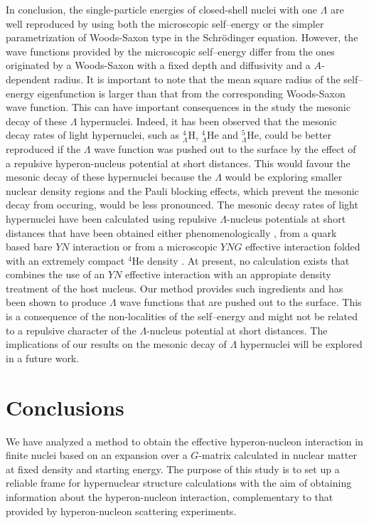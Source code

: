 In conclusion, the single-particle energies of closed-shell nuclei
with one $\Lambda$ are well reproduced 
by using both the microscopic self--energy or the simpler
parametrization of
 Woods-Saxon type in the Schr\"odinger equation. However, the wave
functions provided by the microscopic self--energy differ from the ones
originated by a Woods-Saxon with a fixed depth and diffusivity and
a $A$-dependent radius. It is important to note that the mean square radius of the
self--energy eigenfunction is larger than that from the corresponding
Woods-Saxon wave function. This can have important consequences in 
the study the mesonic decay of these $\Lambda$ hypernuclei.
Indeed, it has been observed that the mesonic decay rates 
of light hypernuclei,
such as $^4_\Lambda$H, $^4_\Lambda$He and $^5_\Lambda$He, could be
better reproduced if the 
$\Lambda$ wave function was pushed out to the surface by the effect of
a repulsive hyperon-nucleus potential at short distances. This would   
favour the mesonic decay of these hypernuclei because the $\Lambda$ would
be exploring smaller nuclear density regions and the Pauli blocking effects,
which prevent the mesonic decay from occuring, would be less pronounced. 
The mesonic decay rates of light hypernuclei have been calculated using
repulsive 
$\Lambda$-nucleus potentials at short distances that have been obtained
either phenomenologically \cite{kuma95}, from a quark based bare $YN$
interaction \cite{straub93} or from a microscopic $YNG$ effective interaction 
folded with an extremely compact $^4$He density \cite{moto91}. At present,
no calculation exists that combines the use of an $YN$ effective interaction
with an appropiate density treatment of the host nucleus. Our method
provides such ingredients and has been shown to produce $\Lambda$ wave 
functions that are pushed out to the surface. This is a consequence of the
non-localities of the self--energy and might not be related to 
a repulsive character of the $\Lambda$-nucleus potential at short distances.
The implications of our
results on the mesonic decay of $\Lambda$ hypernuclei will be 
explored in a future work.



\section{Conclusions}
\label{conclusions}

We have analyzed a method to obtain the effective hyperon-nucleon
interaction in finite nuclei based on an expansion over a
$G$-matrix calculated in nuclear matter at fixed density and starting energy. 
The purpose of this study is to set up a reliable frame for
hypernuclear structure calculations with the aim of obtaining information about the
hyperon-nucleon interaction, complementary to that provided by  
hyperon-nucleon scattering experiments.
 
